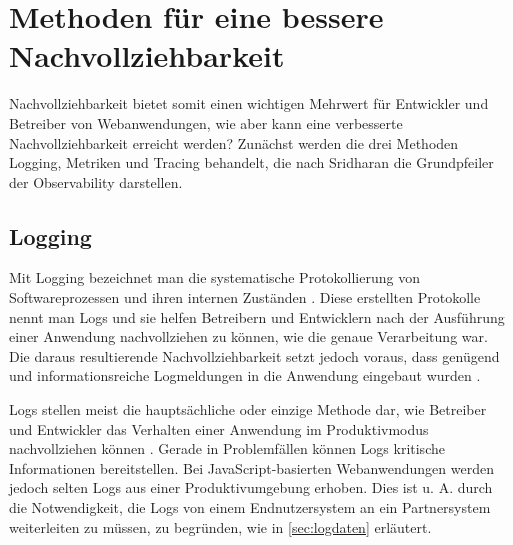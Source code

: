 

\section{Methoden für eine bessere Nachvollziehbarkeit}
\label{sec:methoden}

Nachvollziehbarkeit bietet somit einen wichtigen Mehrwert für Entwickler und Betreiber von Webanwendungen, wie aber kann eine verbesserte Nachvollziehbarkeit erreicht werden? Zunächst werden die drei Methoden Logging, Metriken und Tracing behandelt, die nach Sridharan \etal \cite{DistributedSystemsObservability} die Grundpfeiler der Observability darstellen.

\subsection{Logging}


Mit Logging bezeichnet man die systematische Protokollierung von Softwareprozessen und ihren internen Zuständen \cite{LearningToLog}. Diese erstellten Protokolle nennt man Logs und sie helfen Betreibern und Entwicklern nach der Ausführung einer Anwendung nachvollziehen zu können, wie die genaue Verarbeitung war. Die daraus resultierende Nachvollziehbarkeit setzt jedoch voraus, dass genügend und informationsreiche Logmeldungen in die Anwendung eingebaut wurden \cite{LearningToLog}.

Logs stellen meist die hauptsächliche oder einzige Methode dar, wie Betreiber und Entwickler das Verhalten einer Anwendung im Produktivmodus nachvollziehen können \cite{LearningToLog}. Gerade in Problemfällen können Logs kritische Informationen bereitstellen. Bei JavaScript-basierten Webanwendungen werden jedoch selten Logs aus einer Produktivumgebung erhoben. Dies ist u. A. durch die Notwendigkeit, die Logs von einem Endnutzersystem an ein Partnersystem weiterleiten zu müssen, zu begründen, wie in \autoref{sec:logdaten} erläutert.

